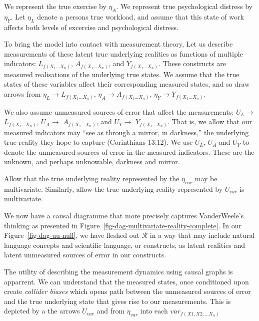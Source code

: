 \documentclass[
  singlecolumn]{report}
\begin{document}
We represent the true exercise by \(\eta_A\). We represent true
psychological distress by \(\eta_Y\). Let \(\eta_L\) denote a persons
true workload, and assume that this state of work affects both levels of
excercise and psychological distress.

To bring the model into contact with measurement theory, Let us describe
measurements of these latent true underlying realities as functions of
multiple indicators: \(L_{f(X_1\dots X_n)}\), \(A_{f(X_1\dots X_n)}\),
and \(Y_{f(X_1\dots X_n)}\). These constructs are measured realisations
of the underlying true states. We assume that the true states of these
variables affect their corresponding measured states, and so draw arrows
from \(\eta_L\rightarrow{L_{f(X_1\dots X_n)}}\),
\(\eta_A\rightarrow{A_{f(X_1\dots X_n)}}\),
\(\eta_Y\rightarrow{Y_{f(X_1\dots X_n)}}\).

We also assume unmeasured sources of error that affect the measurements:
\(U_{L} \rightarrow\) \(L_{f(X_1\dots X_n)}\), \(U_{A} \rightarrow\)
\(A_{f(X_1\dots X_n)}\), and \(U_{Y} \rightarrow\)
\(Y_{f(X_1\dots X_n)}\). That is, we allow that our measured indicators
may ``see as through a mirror, in darkness,'' the underlying true
reality they hope to capture (Corinthians 13:12). We use \(U_{L}\),
\(U_{A}\) and \(U_{Y}\) to denote the unmeasured sources of error in the
measured indicators. These are the unknown, and perhaps unknowable,
darkness and mirror.

Allow that the true underlying reality represented by the \(\eta_{var}\)
may be multivariate. Similarly, allow the true underlying reality
represented by \(U_{var}\) is multivariate.

We now have a causal diagramme that more precisely captures
VanderWeele's thinking as presented in
Figure~\ref{fig-dag-multivariate-reality-complete}. In our
Figure~\ref{fig-dag-uu-null}, we have fleshed out \(\mathcal{R}\) in a
way that may include natural language concepts and scientific language,
or constructs, as latent realities and latent unmeasured sources of
error in our constructs.

The utility of describing the measurement dynamics using causal graphs
is apparrent. We can understand that the measured states, once
conditioned upon create \emph{collider biases} which opens path between
the unmeasured sources of error and the true underlying state that gives
rise to our measurements. This is depicted by a the arrows \(U_{var}\)
and from \(\eta_{var}\) into each \(var_{f(X1, X2,\dots X_n)}\)
\end{document}
